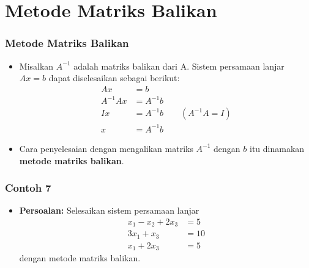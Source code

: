 \documentclass[pdflatex,compress,mathserif]{beamer}
\begin{document}
\section{Metode Matriks Balikan}

\begin{frame}
	\frametitle{Metode Matriks Balikan}
	\begin{itemize}
		\item Misalkan $ A^{-1} $ adalah matriks balikan dari A. Sistem persamaan lanjar $ Ax = b $ dapat diselesaikan sebagai berikut:
		\begin{align*}
			Ax &= b \\
			A^{-1}Ax &= A^{-1}b \\
			Ix &= A^{-1}b \qquad (A^{-1}A = I)\\
			x &= A^{-1}b
		\end{align*}
		\item Cara penyelesaian dengan mengalikan matriks $ A^{-1} $ dengan $ b $ itu dinamakan \textbf{metode matriks balikan}.
	\end{itemize}
\end{frame}

\begin{frame}
	\frametitle{Contoh 7}
	\begin{itemize}
		\item \textbf{Persoalan:} Selesaikan sistem persamaan lanjar
		\begin{align*}
			x_1 - x_2 + 2x_3 &= 5 \\
			3x_1 + x_3 &= 10 \\
			x_1 + 2x_3 &= 5
		\end{align*}
		dengan metode matriks balikan.
	\end{itemize}
\end{frame}
\end{document}
